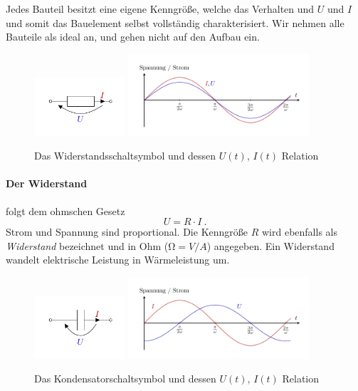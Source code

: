 Jedes Bauteil besitzt eine eigene Kenngröße, welche das Verhalten und $U$ und $I$ und somit das Bauelement selbst
vollständig charakterisiert. Wir nehmen alle Bauteile als ideal an, und gehen nicht auf den Aufbau ein.
\begin{figure}[h!]
    \centering
    \includegraphics[width=0.3\textwidth]{kBR.pdf}
    \includegraphics[width=0.6\textwidth]{kPR.pdf}
    \caption{Das Widerstandsschaltsymbol und dessen $U(t),\, I(t)$ Relation}
\end{figure}
\paragraph*{Der Widerstand} folgt dem ohmschen Gesetz
\begin{equation}\label{eq:R}
    U = R\cdot I ~.
\end{equation}
Strom und Spannung sind proportional. Die Kenngröße $R$ wird ebenfalls als \emph{Widerstand} bezeichnet und in Ohm
($\si{\ohm} = \si{V}/\si{A}$) angegeben. Ein Widerstand wandelt elektrische Leistung in Wärmeleistung um.
\begin{figure}[h!]
    \centering
    \includegraphics[width=0.3\textwidth]{kBC.pdf}
    \includegraphics[width=0.6\textwidth]{kPC.pdf}
    \caption{Das Kondensatorschaltsymbol und dessen $U(t),\, I(t)$ Relation}
\end{figure}
